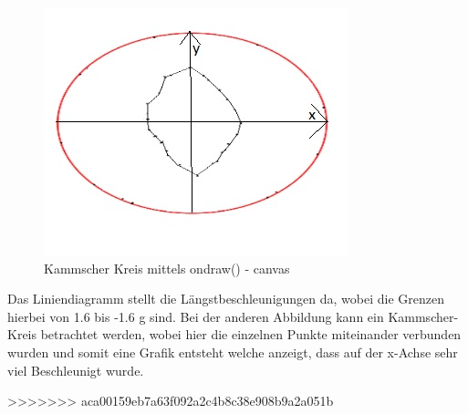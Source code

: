 \begin{figure}[!tbp]
\begin{minipage}[b]{0.4\textwidth}
 		\includegraphics[width=\textwidth]{images/Kammscherkreis-u}
 		\caption{Kammscher Kreis mittels ondraw() - canvas}
 	\end{minipage}
\end{figure}


Das Liniendiagramm stellt die Längstbeschleunigungen da, wobei die Grenzen hierbei von 1.6 bis -1.6 g sind.
Bei der anderen Abbildung kann ein Kammscher-Kreis betrachtet werden, wobei hier die einzelnen Punkte miteinander verbunden wurden und somit eine Grafik entsteht welche anzeigt, dass auf der x-Achse sehr viel Beschleunigt wurde.

 
>>>>>>> aca00159eb7a63f092a2c4b8c38e908b9a2a051b
\clearpage %